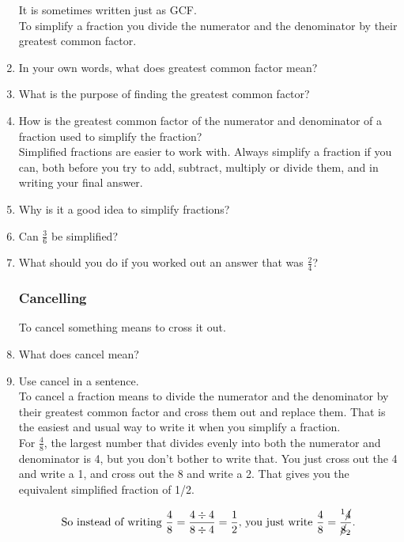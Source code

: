 \documentclass[14pt]{article}
\begin{document}
\begin{enumerate}
It is sometimes written just as GCF.\\

To simplify a fraction you divide the numerator and the denominator  by their greatest common factor.\\

\item In your own words, what does greatest common factor mean?
\item What is the purpose of finding the greatest common factor?
\item How is the greatest common factor of the numerator and denominator of a fraction used to simplify the fraction?\\

Simplified fractions are easier to work with. Always simplify a fraction if you can, both before you try to add, subtract, multiply or divide them, and in writing your final answer.

\item Why is it a good idea to simplify fractions?
\item Can $\frac{3}{6}$ be simplified?
\item What should you do if you worked out an answer that was $\frac{2}{4}$?

\newpage

\subsubsection*{Cancelling}
To cancel something means to cross it out.\\

\item What does cancel mean?
\item Use cancel in a sentence.\\

To cancel a fraction means to divide the numerator and the denominator by their greatest common factor and cross them out and replace them. That is the easiest and usual way to write it when you simplify a fraction.\\

For $\frac{4}{8}$, the largest number that divides evenly into both the numerator and denominator is 4, but you don't bother to write that. You just cross out the 4 and write a 1, and cross out the 8 and write a 2. That gives you the equivalent simplified fraction of 1/2.

$$\text{So instead of writing }\frac{4}{8} = \frac{4 \div 4}{8 \div 4} = \frac{1}{2}\text{, you just write }\frac{4}{8} = \frac{^1 \cancel{4}}{\cancel{8}_2}\text{.}$$


\end{enumerate}
\end{document}

